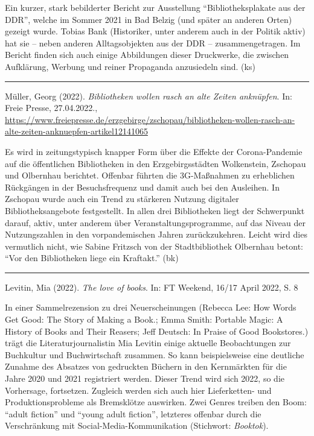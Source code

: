 \documentclass[a4paper,
fontsize=11pt,
oneside,
numbers=noperiodatend,
parskip=half-,
bibliography=totoc,
final
]{scrartcl}
\begin{document}
Ein kurzer, stark bebilderter Bericht zur Ausstellung
\enquote{Bibliotheksplakate aus der DDR}, welche im Sommer 2021 in Bad
Belzig (und später an anderen Orten) gezeigt wurde. Tobias Bank
(Historiker, unter anderem auch in der Politik aktiv) hat sie -- neben
anderen Alltagsobjekten aus der DDR -- zusammengetragen. Im Bericht
finden sich auch einige Abbildungen dieser Druckwerke, die zwischen
Aufklärung, Werbung und reiner Propaganda anzusiedeln sind. (ks)

\begin{center}\rule{0.5\linewidth}{0.5pt}\end{center}

Müller, Georg (2022). \emph{Bibliotheken wollen rasch an alte Zeiten
anknüpfen}. In: Freie Presse, 27.04.2022.,
\url{https://www.freiepresse.de/erzgebirge/zschopau/bibliotheken-wollen-rasch-an-alte-zeiten-anknuepfen-artikel12141065}

Es wird in zeitungstypisch knapper Form über die Effekte der
Corona-Pandemie auf die öffentlichen Bibliotheken in den
Erzgebirgsstädten Wolkenstein, Zschopau und Olbernhau berichtet.
Offenbar führten die 3G-Maßnahmen zu erheblichen Rückgängen in der
Besuchsfrequenz und damit auch bei den Ausleihen. In Zschopau wurde auch
ein Trend zu stärkeren Nutzung digitaler Bibliotheksangebote
festgestellt. In allen drei Bibliotheken liegt der Schwerpunkt darauf,
aktiv, unter anderem über Veranstaltungsprogramme, auf das Niveau der
Nutzungszahlen in den vorpandemischen Jahren zurückzukehren. Leicht wird
dies vermutlich nicht, wie Sabine Fritzsch von der Stadtbibliothek
Olbernhau betont: \enquote{Vor den Bibliotheken liege ein Kraftakt.}
(bk)

\begin{center}\rule{0.5\linewidth}{0.5pt}\end{center}

Levitin, Mia (2022). \emph{The love of books}. In: FT Weekend, 16/17
April 2022, S. 8

In einer Sammelrezension zu drei Neuerscheinungen (Rebecca Lee: How
Words Get Good: The Story of Making a Book.; Emma Smith: Portable Magic:
A History of Books and Their Reasers; Jeff Deutsch: In Praise of Good
Bookstores.) trägt die Literaturjournalistin Mia Levitin einige aktuelle
Beobachtungen zur Buchkultur und Buchwirtschaft zusammen. So kann
beispielsweise eine deutliche Zunahme des Absatzes von gedruckten
Büchern in den Kernmärkten für die Jahre 2020 und 2021 registriert
werden. Dieser Trend wird sich 2022, so die Vorhersage, fortsetzen.
Zugleich werden sich auch hier Lieferketten- und Produktionsprobleme als
Bremsklötze auswirken. Zwei Genres treiben den Boom: \enquote{adult
fiction} und \enquote{young adult fiction}, letzteres offenbar durch die
Verschränkung mit Social-Media-Kommunikation (Stichwort:
\emph{Booktok}).
\end{document}
